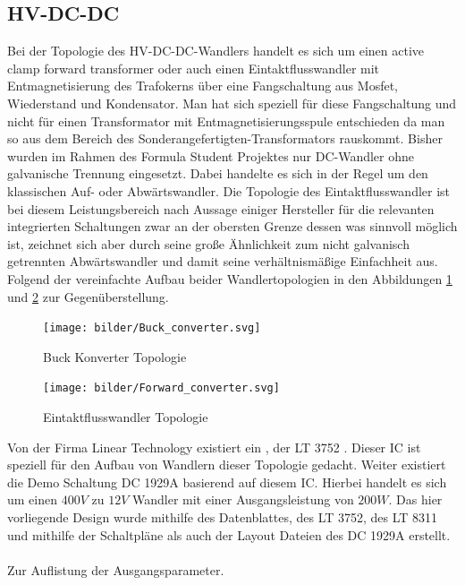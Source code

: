 \FloatBarrier
\subsection{\ac{HV}-DC-DC}
Bei der Topologie des \ac{HV}-DC-DC-Wandlers handelt es sich um einen active clamp forward transformer oder auch einen Eintaktflusswandler mit Entmagnetisierung des Trafokerns über eine Fangschaltung aus Mosfet, Wiederstand und Kondensator. Man hat sich speziell für diese Fangschaltung und nicht für einen Transformator mit Entmagnetisierungsspule entschieden da man so aus dem Bereich des Sonderangefertigten-Transformators rauskommt. Bisher wurden im Rahmen des Formula Student Projektes nur DC-Wandler ohne galvanische Trennung eingesetzt. Dabei handelte es sich in der Regel um den klassischen Auf- oder Abwärtswandler. Die Topologie des Eintaktflusswandler ist bei diesem Leistungsbereich nach Aussage einiger Hersteller für die relevanten integrierten Schaltungen zwar an der obersten Grenze dessen was sinnvoll möglich ist, zeichnet sich aber durch seine große Ähnlichkeit zum nicht galvanisch getrennten Abwärtswandler und damit seine verhältnismäßige Einfachheit aus. Folgend der vereinfachte Aufbau beider Wandlertopologien in den Abbildungen \ref{fig:buckconverter} und \ref{fig:forwardconverter} zur Gegenüberstellung.

\begin{figure}
	\centering
	\texttt{[image: bilder/Buck\_converter.svg]}
	\caption{Buck Konverter Topologie \cite{WikiWandlertopo}}
	\label{fig:buckconverter}
\end{figure}

\begin{figure}
	\centering
	\texttt{[image: bilder/Forward\_converter.svg]}
	\caption{Eintaktflusswandler Topologie \cite{WikiWandlertopo}}
	\label{fig:forwardconverter}
\end{figure}

Von der Firma Linear Technology existiert ein , der LT 3752 \cite{LT3752LT3752-1}. Dieser \ac{IC} ist speziell für den Aufbau von Wandlern dieser Topologie gedacht. Weiter existiert die Demo Schaltung DC 1929A \cite{DC1929A} basierend auf diesem \ac{IC}. Hierbei handelt es sich um einen \ensuremath{400 V} zu \ensuremath{12 V} Wandler mit einer Ausgangsleistung von \ensuremath{200 W}. Das hier vorliegende Design wurde mithilfe des Datenblattes, des LT 3752, des LT 8311 \cite{LT8311} und mithilfe der Schaltpläne als auch der Layout Dateien des DC 1929A erstellt.
\\
\\
Zur Auflistung der Ausgangsparameter.

